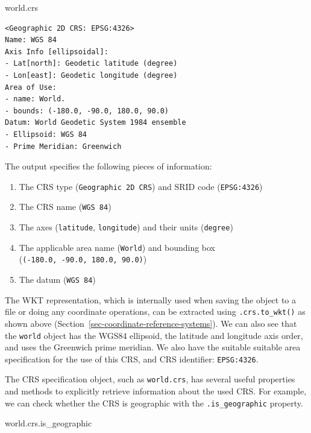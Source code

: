 \documentclass[
  letterpaper,
]{krantz}
\newenvironment{Shaded}{\begin{snugshade}}{\end{snugshade}}
\newcommand{\NormalTok}[1]{\textcolor[rgb]{0.00,0.23,0.31}{#1}}
\providecommand{\tightlist}{%
  \setlength{\itemsep}{0pt}\setlength{\parskip}{0pt}}\usepackage{longtable,booktabs,array}
\begin{document}
\begin{Shaded}
\begin{Highlighting}[]
\NormalTok{world.crs}
\end{Highlighting}
\end{Shaded}

\begin{verbatim}
<Geographic 2D CRS: EPSG:4326>
Name: WGS 84
Axis Info [ellipsoidal]:
- Lat[north]: Geodetic latitude (degree)
- Lon[east]: Geodetic longitude (degree)
Area of Use:
- name: World.
- bounds: (-180.0, -90.0, 180.0, 90.0)
Datum: World Geodetic System 1984 ensemble
- Ellipsoid: WGS 84
- Prime Meridian: Greenwich
\end{verbatim}

The output specifies the following pieces of information:

\begin{enumerate}
\def\labelenumi{\arabic{enumi}.}
\tightlist
\item
  The CRS type (\texttt{Geographic\ 2D\ CRS}) and SRID code
  (\texttt{EPSG:4326})
\item
  The CRS name (\texttt{WGS\ 84})
\item
  The axes (\texttt{latitude}, \texttt{longitude}) and their units
  (\texttt{degree})
\item
  The applicable area name (\texttt{World}) and bounding box
  (\texttt{(-180.0,\ -90.0,\ 180.0,\ 90.0)})
\item
  The datum (\texttt{WGS\ 84})
\end{enumerate}

The WKT representation, which is internally used when saving the object
to a file or doing any coordinate operations, can be extracted using
\texttt{.crs.to\_wkt()} as shown above
(Section~\ref{sec-coordinate-reference-systems}). We can also see that
the \texttt{world} object has the WGS84 ellipsoid, the latitude and
longitude axis order, and uses the Greenwich prime meridian. We also
have the suitable suitable area specification for the use of this CRS,
and CRS identifier: \texttt{EPSG:4326}.

The CRS specification object, such as \texttt{world.crs}, has several
useful properties and methods to explicitly retrieve information about
the used CRS. For example, we can check whether the CRS is geographic
with the \texttt{.is\_geographic} property.

\begin{Shaded}
\begin{Highlighting}[]
\NormalTok{world.crs.is\_geographic}
\end{Highlighting}
\end{Shaded}
\end{document}
